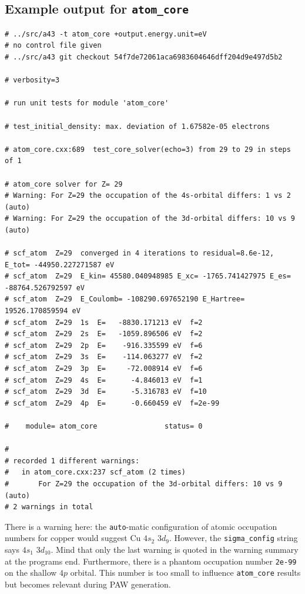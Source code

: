 \documentclass[oribibl]{llncs}
\newcommand{\ttt}[1]{\texttt{#1}}
\begin{document}
\subsection{Example output for \ttt{atom\_core}} \label{sec:example-output-for-atom-core}
\small
\begin{verbatim}
# ../src/a43 -t atom_core +output.energy.unit=eV
# no control file given
# ../src/a43 git checkout 54f7de72061aca6983604646dff204d9e497d5b2

# verbosity=3

# run unit tests for module 'atom_core'

# test_initial_density: max. deviation of 1.67582e-05 electrons

# atom_core.cxx:689  test_core_solver(echo=3) from 29 to 29 in steps of 1

# atom_core solver for Z= 29
# Warning: For Z=29 the occupation of the 4s-orbital differs: 1 vs 2 (auto)
# Warning: For Z=29 the occupation of the 3d-orbital differs: 10 vs 9 (auto)

# scf_atom  Z=29  converged in 4 iterations to residual=8.6e-12, E_tot= -44950.227271587 eV
# scf_atom  Z=29  E_kin= 45580.040948985 E_xc= -1765.741427975 E_es= -88764.526792597 eV
# scf_atom  Z=29  E_Coulomb= -108290.697652190 E_Hartree= 19526.170859594 eV
# scf_atom  Z=29  1s  E=   -8830.171213 eV  f=2
# scf_atom  Z=29  2s  E=   -1059.896506 eV  f=2
# scf_atom  Z=29  2p  E=    -916.335599 eV  f=6
# scf_atom  Z=29  3s  E=    -114.063277 eV  f=2
# scf_atom  Z=29  3p  E=     -72.008914 eV  f=6
# scf_atom  Z=29  4s  E=      -4.846013 eV  f=1
# scf_atom  Z=29  3d  E=      -5.316783 eV  f=10
# scf_atom  Z=29  4p  E=      -0.660459 eV  f=2e-99

#    module= atom_core                status= 0

#
# recorded 1 different warnings:
# 	in atom_core.cxx:237 scf_atom (2 times)
# 		For Z=29 the occupation of the 3d-orbital differs: 10 vs 9 (auto)
# 2 warnings in total
\end{verbatim}
\normalsize
%
\noindent
There is a warning here: the \ttt{auto}-matic configuration of atomic occupation numbers
for copper would suggest Cu $4s_{2}$ $3d_{9}$. However, the \ttt{sigma\_config} string
says $4s_{1}$ $3d_{10}$.
Mind that only the last warning is quoted in the warning summary at the programs end.
Furthermore, there is a phantom occupation number \ttt{2e-99} on the shallow $4p$ orbital.
This number is too small to influence \ttt{atom\_core} results but becomes relevant during \ac{PAW} generation.
\end{document}
